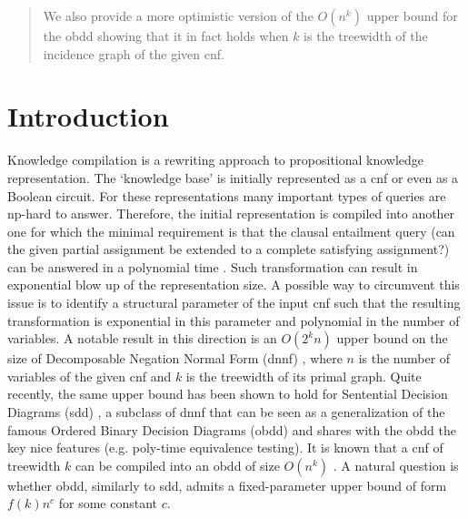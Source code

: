 \documentclass{article}
\begin{document}
\begin{abstract}
We also provide a more optimistic version of the $O(n^k)$ upper bound for the {\sc obdd} showing
that it in fact holds when $k$ is the treewidth of the incidence graph of the given {\sc cnf}.
\begin{comment}
Thus together with the upper bound of \cite{VardiTWD},
the results of this paper provide a complete classification of the expressive power of {\sc obdd} for
{\sc cnf}s parameterized by the treewidth of their primal and incidence graphs.
\end{comment} 
\begin{comment}
In \cite{VardiTWD}, it is shown that a CNF of $n$ variables and the treewidth
$k$ of its primal graph can be compiled into an Ordered Binary Decision Diagram (OBDD)
of size $O(n^k)$. In this paper we show that there is an infinite class of CNFs for 
which the OBDD size is at least $\frac{n^{k/4}}{o(n)}$ thus essentially matching the above upper bound.
To the best of our knowledge, this is the first result ruling the possibility of fixed-parameter
tractable size OBDDs for CNFs of bounded treewidth. We also show that the $O(n^k)$ upper bound
holds for the case where $k$ is the treewidth of the incidence graph of the given {\sc cnf}.
\end{comment}
\end{abstract}

\section{Introduction}
Knowledge compilation is a rewriting approach to propositional knowledge representation.
The `knowledge base' is initially represented as a {\sc cnf} or even as a Boolean circuit. 
For these representations many important types of queries are {\sc np}-hard to answer.
Therefore, the initial representation is compiled into another one 
for which the minimal requirement is that the clausal entailment query
(can the given partial assignment be extended to a complete satisfying assignment?)
can be answered in a polynomial time \cite{DerMar}. Such transformation can result in exponential
blow up of the representation size. A possible way to circumvent this issue is to
identify a structural parameter of the input {\sc cnf} such that the resulting transformation
is exponential in this parameter and polynomial in the number of variables.
A notable result in this direction is an $O(2^kn)$ upper bound on the size of
Decomposable Negation Normal Form ({\sc dnnf}) \cite{DarwicheJACM}, where $n$ is the
number of variables of the given {\sc cnf} and $k$ is the treewidth of its primal graph.
Quite recently, the same upper bound has been shown to hold for Sentential Decision Diagrams ({\sc sdd}) \cite{SDD},
a subclass of {\sc dnnf}  
that can be seen as a generalization
of the famous Ordered Binary Decision Diagrams ({\sc obdd}) and 
shares with the {\sc obdd} the key nice features (e.g. poly-time equivalence testing). It is known that a {\sc cnf} of treewidth
$k$ can be compiled into an {\sc obdd} of size $O(n^{k})$ \cite{VardiTWD}. A natural question is whether 
{\sc obdd}, similarly to {\sc sdd}, admits a fixed-parameter upper bound of form $f(k)n^c$ for some constant $c$. 
\end{document}
